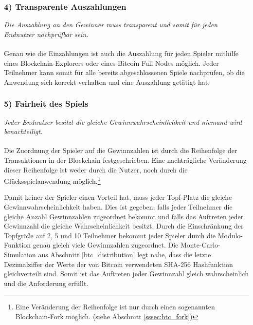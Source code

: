 \subsubsection{4) Transparente Auszahlungen}
\textit{Die Auszahlung an den Gewinner muss transparent und somit für jeden Endnutzer nachprüfbar sein.}\\\\
Genau wie die Einzahlungen ist auch die Auszahlung für jeden Spieler mithilfe eines Blockchain-Explorers oder eines Bitcoin Full Nodes möglich. Jeder Teilnehmer kann somit für alle bereits abgeschlossenen Spiele nachprüfen, ob die Anwendung sich korrekt verhalten und eine Auszahlung getätigt hat. 
\subsubsection{5) Fairheit des Spiels}
\textit{Jeder Endnutzer besitzt die gleiche Gewinnwahrscheinlichkeit und niemand wird benachteiligt}.\\\\
Die Zuordnung der Spieler auf die Gewinnzahlen ist durch die Reihenfolge der Transaktionen in der Blockchain festgeschrieben. Eine nachträgliche Veränderung dieser Reihenfolge ist weder durch die Nutzer, noch durch die Glücksspielanwendung möglich.\footnote{Eine Veränderung der Reihenfolge ist nur durch einen sogenannten Blockchain-Fork möglich. (siehe Abschnitt \ref{sssec:btc_fork})}

Damit keiner der Spieler einen Vorteil hat, muss jeder Topf-Platz die gleiche Gewinnwahrscheinlichkeit haben.
Dies ist gegeben, falls jeder Teilnehmer die gleiche Anzahl Gewinnzahlen zugeordnet bekommt und falls das Auftreten jeder Gewinnzahl die gleiche Wahrscheinlichkeit besitzt. Durch die Einschränkung der Topfgröße auf 2, 5 und 10 Teilnehmer bekommt jeder Spieler durch die Modulo-Funktion genau gleich viele Gewinnzahlen zugeordnet. Die Monte-Carlo-Simulation aus Abschnitt \ref{btc_distribution} legt nahe, dass die letzte Dezimalziffer der Werte der von Bitcoin verwendeten SHA-256 Hashfunktion gleichverteilt sind. Somit ist das Auftreten jeder Gewinnzahl gleich wahrscheinlich und die Anforderung erfüllt.

